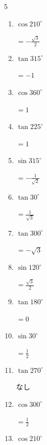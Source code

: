 \begin{multicols}{5}
\begin{enumerate}
        $\displaystyle =\frac{1}{2}$

  \item $\displaystyle \cos{210^\circ}$

        $\displaystyle =-\frac{\sqrt{3}}{2}$

  \item $\displaystyle \tan{315^\circ}$

        $\displaystyle =-1$

  \item $\displaystyle \cos{360^\circ}$

        $\displaystyle =1$

  \item $\displaystyle \tan{225^\circ}$

        $\displaystyle =1$

  \item $\displaystyle \sin{315^\circ}$

        $\displaystyle =-\frac{1}{\sqrt{2}}$

  \item $\displaystyle \tan{30^\circ}$

        $\displaystyle =\frac{1}{\sqrt{3}}$

  \item $\displaystyle \tan{300^\circ}$

        $\displaystyle =-\sqrt{3}$

  \item $\displaystyle \sin{120^\circ}$

        $\displaystyle =\frac{\sqrt{3}}{2}$

  \item $\displaystyle \tan{180^\circ}$

        $\displaystyle =0$

  \item $\displaystyle \sin{30^\circ}$

        $\displaystyle =\frac{1}{2}$

  \item $\displaystyle \tan{270^\circ}$

        $\displaystyle なし$

  \item $\displaystyle \cos{300^\circ}$

        $\displaystyle =\frac{1}{2}$

\columnbreak %

  \item $\displaystyle \cos{210^\circ}$


\end{enumerate}
\end{multicols}
